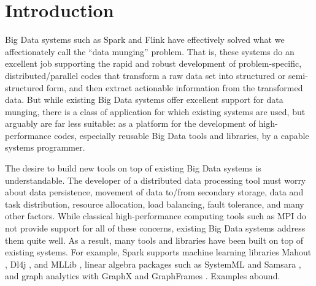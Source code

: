 
\section{Introduction}

Big Data systems such as Spark \cite{zaharia2010spark} and Flink \cite{alexandrov2014stratosphere, carbone2015apache}
have effectively solved what we affectionately call the ``data munging'' problem.  That is, 
these systems do an excellent job supporting the rapid
and robust development of problem-specific,
distributed/parallel codes that transform a raw data set into structured 
or semi-structured form, and then
extract actionable information from the transformed data.
But while existing Big Data systems offer
excellent support for data munging,
there is a class of application for which 
existing systems are 
used, but arguably are far less suitable:
as a platform 
for the development of high-performance codes, especially reusable
Big Data tools and libraries, by a capable
systems programmer.

The desire to build new tools
on top of existing Big Data systems is understandable.  
The  developer of a distributed data processing tool must worry about data persistence, movement of
data to/from secondary storage, data
and task distribution, resource allocation, load balancing, fault tolerance, and many other factors.
While classical high-performance computing
tools such as MPI \cite{gropp1996high} do not provide support for all of these concerns,
existing Big Data systems 
address them quite well.
As a result, many tools and libraries have been built on top of existing systems.  For example,
Spark supports
machine learning libraries Mahout \cite{mahout}, Dl4j \cite{dj4j}, 
and MLLib \cite{meng2016mllib}, linear algebra packages such as SystemML \cite{tian2012scalable, boehm2016systemml, ghoting2011systemml, boehm2014hybrid} and Samsara \cite{samsara}, and graph analytics with
GraphX \cite{gonzalez2014graphx} and GraphFrames
\cite{dave2016graphframes}.  Examples abound.


